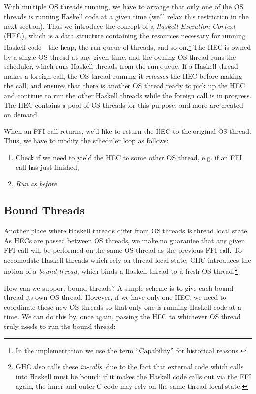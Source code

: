 With multiple OS threads running, we have to arrange that only one of
the OS threads is running Haskell code at a given time (we'll relax
this restriction in the next section).  Thus we introduce the concept
of a \emph{Haskell Execution Context} (HEC), which is a data structure
containing the resources necessary for running Haskell code---the
heap, the run queue of threads, and so on.\footnote{In the
  implementation we use the term ``Capability'' for historical
  reasons.} The HEC is owned by a single OS thread at any given time,
and the owning OS thread runs the scheduler, which runs Haskell
threads from the run queue.  If a Haskell thread makes a foreign call,
the OS thread running it \emph{releases} the HEC before making the
call, and ensures that there is another OS thread ready to pick up the
HEC and continue to run the other Haskell threads while the foreign
call is in progress.  The HEC contains a pool of OS threads for this
purpose, and more are created on demand.

When an FFI call returns, we'd like to return the HEC to the
original OS thread. Thus, we have to modify the scheduler loop as follows:

\begin{enumerate}
    \item Check if we need to yield the HEC to some other OS thread, e.g. if an FFI call has just finished,
    \item \emph{Run as before.}
\end{enumerate}

\subsection{Bound Threads}


Another place where Haskell threads differ from OS threads is thread
local state.  As HECs are passed between OS threads, we make no
guarantee that any given FFI call will be performed on the same OS
thread as the previous FFI call.  To accomodate Haskell threads which
rely on thread-local state, GHC introduces the notion of a \emph{bound thread},
which binds a Haskell thread to a fresh OS thread.\footnote{GHC
    also calls these \emph{in-calls}, due to the fact that external code
    which calls into Haskell must be bound: if it makes the Haskell code
calls out via the FFI again, the inner and outer C code may rely on the
same thread local state.}

How can we support bound threads?  A simple scheme is to give each bound
thread its own OS thread.  However, if we have only one HEC, we
need to coordinate these new OS threads so that only one is running
Haskell code at a time.  We can do this by, once again, passing the
HEC to whichever OS thread truly needs to run the bound thread:

